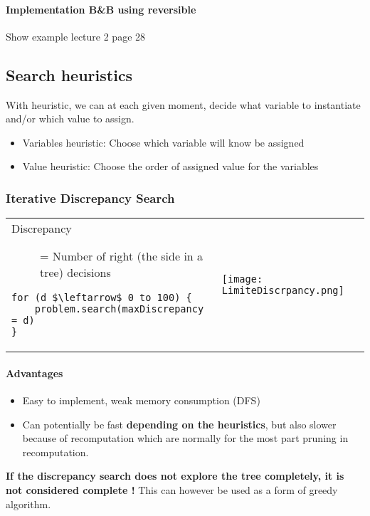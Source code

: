 \paragraph{Implementation B\&B using reversible}
Show example lecture 2 page 28

\subsection{Search heuristics}
With heuristic, we can at each given moment, decide what variable to instantiate 
and/or which value to assign. 

\begin{itemize}
    \item Variables heuristic: Choose which variable will know be 
        assigned
    \item Value heuristic: Choose the order of assigned value for
        the variables
    \end{itemize}

\subsubsection{Iterative Discrepancy Search}

\begin{tabular}{m{11cm}m{6cm}}
\begin{description}
    \item[Discrepancy] = Number of right (the side in a tree) decisions
\end{description}
\begin{lstlisting}[mathescape]
for (d $\leftarrow$ 0 to 100) {
    problem.search(maxDiscrepancy = d)
}
\end{lstlisting}
&
    \texttt{[image: LimiteDiscrpancy.png]}
\end{tabular}


\paragraph{Advantages}
\begin{itemize}
    \item Easy to implement, weak memory consumption (DFS)
    \item Can potentially be fast \textbf{depending on the heuristics},
        but also slower because of recomputation which are normally for the
        most part pruning in recomputation.
\end{itemize}

\textbf{If the discrepancy search does not explore the tree completely, 
it is not considered complete !} This can however be used as a form of greedy
algorithm.

